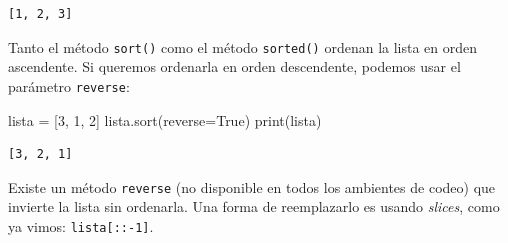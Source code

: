 \documentclass[
  letterpaper,
  DIV=11,
  numbers=noendperiod]{scrreprt}
\newenvironment{Shaded}{\begin{snugshade}}{\end{snugshade}}
\newcommand{\BuiltInTok}[1]{\textcolor[rgb]{0.00,0.23,0.31}{#1}}
\newcommand{\DecValTok}[1]{\textcolor[rgb]{0.68,0.00,0.00}{#1}}
\newcommand{\NormalTok}[1]{\textcolor[rgb]{0.00,0.23,0.31}{#1}}
\newcommand{\OperatorTok}[1]{\textcolor[rgb]{0.37,0.37,0.37}{#1}}
\newcommand{\VariableTok}[1]{\textcolor[rgb]{0.07,0.07,0.07}{#1}}
\begin{document}
\begin{verbatim}
[1, 2, 3]
\end{verbatim}

Tanto el método \texttt{sort()} como el método \texttt{sorted()} ordenan
la lista en orden ascendente. Si queremos ordenarla en orden
descendente, podemos usar el parámetro \texttt{reverse}:

\begin{Shaded}
\begin{Highlighting}[]
\NormalTok{lista }\OperatorTok{=}\NormalTok{ [}\DecValTok{3}\NormalTok{, }\DecValTok{1}\NormalTok{, }\DecValTok{2}\NormalTok{]}
\NormalTok{lista.sort(reverse}\OperatorTok{=}\VariableTok{True}\NormalTok{)}
\BuiltInTok{print}\NormalTok{(lista)}
\end{Highlighting}
\end{Shaded}

\begin{verbatim}
[3, 2, 1]
\end{verbatim}

Existe un método \texttt{reverse} (no disponible en todos los ambientes
de codeo) que invierte la lista sin ordenarla. Una forma de reemplazarlo
es usando \emph{slices}, como ya vimos: \texttt{lista{[}::-1{]}}.
\end{document}
